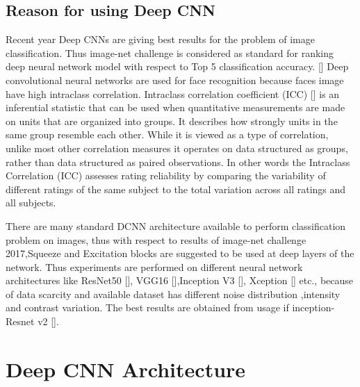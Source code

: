 \documentclass[a4paper,12pt, twoside]{NITKReport}
\begin{document}
\subsection{Reason for using Deep CNN}
\par Recent year Deep CNNs are giving best results for the problem of image classification. Thus image-net challenge is considered as standard for ranking deep neural network model with respect to Top 5 classification accuracy. [\cite{NIPS2012_4824}] Deep convolutional neural networks are used for face recognition because faces image have high intraclass correlation. Intraclass correlation coefficient (ICC) [\cite{koch1982intraclass}] is an inferential statistic that can be used when quantitative measurements are made on units that are organized into groups. It describes how strongly units in the same group resemble each other. While it is viewed as a type of correlation, unlike most other correlation measures it operates on data structured as groups, rather than data structured as paired observations. In other words the Intraclass Correlation (ICC) assesses rating reliability by comparing the variability of different ratings of the same subject to the total variation across all ratings and all subjects.
\par There are many standard DCNN architecture available to perform classification problem on images, thus with respect to results of image-net challenge 2017,Squeeze and Excitation blocks are suggested to be used at deep layers of the network. Thus experiments are performed on different neural network architectures like ResNet50 [\cite{he2016deep}], VGG16 [\cite{DBLP:journals/corr/SimonyanZ14a}],Inception V3 [\cite{DBLP:journals/corr/SzegedyVISW15}], Xception [\cite{DBLP:journals/corr/Chollet16a}] etc., because of data scarcity and available dataset has different noise distribution ,intensity and contrast variation. The best results are obtained from usage if inception-Resnet v2 [\cite{DBLP:journals/corr/SzegedyIV16}].

\section{Deep CNN Architecture}
\end{document}
